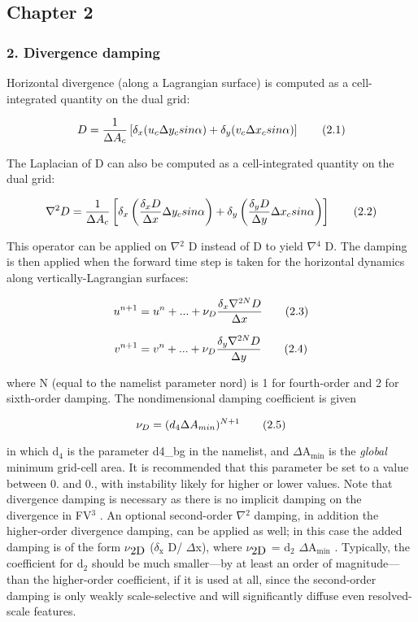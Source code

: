 \subsection*{Chapter 2}

\subsubsection*{2. Divergence damping}

Horizontal divergence (along a Lagrangian surface) is computed as a cell-\/ integrated quantity on the dual grid\-:

\[ D = \frac{1}{\Delta A_c} \left[ \delta_x (u_c \Delta y_c sin\alpha) + \delta_y (v_c \Delta x_c sin \alpha) \right] \\ \tag {2.1} \]

The Laplacian of D can also be computed as a cell-\/integrated quantity on the dual grid\-:

\[ \nabla^2 D = \frac{1}{\Delta A_c} \left[ \delta_x \left(\frac{\delta_x D}{\Delta x} \Delta y_c sin\alpha \right) + \delta_y \left(\frac{\delta_y D}{\Delta y} \Delta x_c sin \alpha \right) \right] \\ \tag {2.2} \]

This operator can be applied on {$\nabla$}$^{\mbox{2}}$ D instead of D to yield {$\nabla$}$^{\mbox{4}}$ D. The damping is then applied when the forward time step is taken for the horizontal dynamics along vertically-\/\-Lagrangian surfaces\-:

\[ u^{n+1} = u^n + . . . + \nu_D \frac{\delta_x \nabla^{2N} D}{\Delta x} \\ \tag {2.3} \]

\[ v^{n+1} = v^n + . . . + \nu_D \frac{\delta_y \nabla^{2N} D}{\Delta y} \\ \tag {2.4} \]

where N (equal to the namelist parameter {\ttfamily nord}) is 1 for fourth-\/order and 2 for sixth-\/order damping. The nondimensional damping coefficient is given

\[ \nu_D = (d_4\Delta A_{min} )^{N+1} \\ \tag {2.5} \]

in which d$_{\mbox{4}}$  is the parameter {\ttfamily d4\-\_\-bg} in the namelist, and {$\Delta$}A$_{\mbox{min}}$  is the {\itshape global} minimum grid-\/cell area. It is recommended that this parameter be set to a value between 0. and 0., with instability likely for higher or lower values. Note that divergence damping is necessary as there is no implicit damping on the divergence in F\-V$^{\mbox{3}}$ . An optional second-\/order {$\nabla$}$^{\mbox{2}}$  damping, in addition the higher-\/order divergence damping, can be applied as well; in this case the added damping is of the form {$\nu$}$_{\mbox{2\-D}}$ ({$\delta$}$_{\mbox{x}}$ D/ {$\Delta$}x), where {$\nu$}$_{\mbox{2\-D}}$  = d$_{\mbox{2}}$ {$\Delta$}A$_{\mbox{min}}$ . Typically, the coefficient for d$_{\mbox{2}}$  should be much smaller—by at least an order of magnitude—than the higher-\/order coefficient, if it is used at all, since the second-\/order damping is only weakly scale-\/selective and will significantly diffuse even resolved-\/scale features.

